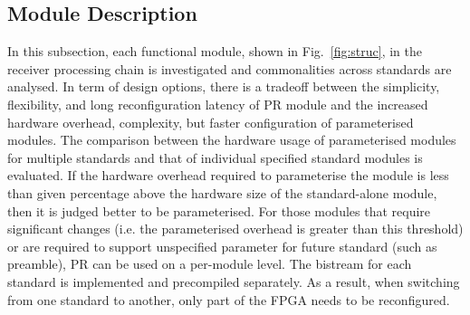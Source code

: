 	\subsection{Module Description}

In this subsection, each functional module, shown in Fig.~\ref{fig:struc}, in the receiver processing chain is investigated and commonalities across standards are analysed.
In term of design options, there is a tradeoff between the simplicity, flexibility, and long reconfiguration latency of PR module and the increased hardware overhead, complexity, but faster configuration of parameterised modules.
The comparison between the hardware usage of parameterised modules for multiple standards and that of individual specified standard modules is evaluated.
If the hardware overhead required to parameterise the module is less than given percentage above the hardware size of the standard-alone module, then it is judged better to be parameterised.  
For those modules that require significant changes (i.e. the parameterised overhead is greater than this threshold) or are required to support unspecified parameter for future standard (such as preamble), PR can be used on a per-module level. 
The bistream for each standard is implemented and precompiled separately.
As a result, when switching from one standard to another, only part of the FPGA needs to be reconfigured.

